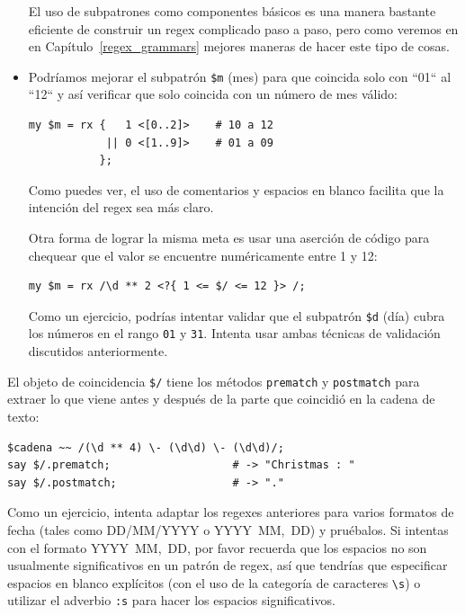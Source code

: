 \begin{itemize}
El uso de subpatrones como componentes básicos es una manera
bastante eficiente de construir un regex complicado paso a
paso, pero como veremos en en Capítulo~\ref{regex_grammars}
mejores maneras de hacer este tipo de cosas.

\item Podríamos mejorar el subpatrón \verb'$m' (mes) 
para que coincida solo con ``01`` al ``12`` y así 
verificar que solo coincida con un número de mes válido:

\begin{verbatim}
my $m = rx {   1 <[0..2]>    # 10 a 12
            || 0 <[1..9]>    # 01 a 09
           };
\end{verbatim}
%

Como puedes ver, el uso de comentarios y espacios en blanco
facilita que la intención del regex sea más claro.

Otra forma de lograr la misma meta es usar una aserción de
código para chequear que el valor se encuentre numéricamente
entre 1 y 12:

\begin{verbatim}
my $m = rx /\d ** 2 <?{ 1 <= $/ <= 12 }> /;
\end{verbatim}

Como un ejercicio, podrías intentar validar que el 
subpatrón \verb|$d| (día) cubra los números en el rango
\verb|01| y \verb|31|. Intenta usar ambas técnicas de validación
discutidos anteriormente.

\end{itemize}

El objeto de coincidencia \verb|$/| tiene los métodos 
{\tt prematch} y {\tt postmatch} para extraer lo que 
viene antes y después de la parte que coincidió en la 
cadena de texto:

\begin{verbatim}
$cadena ~~ /(\d ** 4) \- (\d\d) \- (\d\d)/;
say $/.prematch;                   # -> "Christmas : "
say $/.postmatch;                  # -> "."
\end{verbatim}
%

Como un ejercicio, intenta adaptar los regexes anteriores
para varios formatos de fecha (tales como DD/MM/YYYY o 
YYYY~MM,~DD) y pruébalos. Si intentas con el formato
YYYY~MM,~DD, por favor recuerda que los espacios no son
usualmente significativos en un patrón de regex, así que 
tendrías que especificar espacios en blanco explícitos
(con el uso de la categoría de caracteres \verb|\s|) o 
utilizar el adverbio \verb|:s| para hacer los espacios
significativos.

